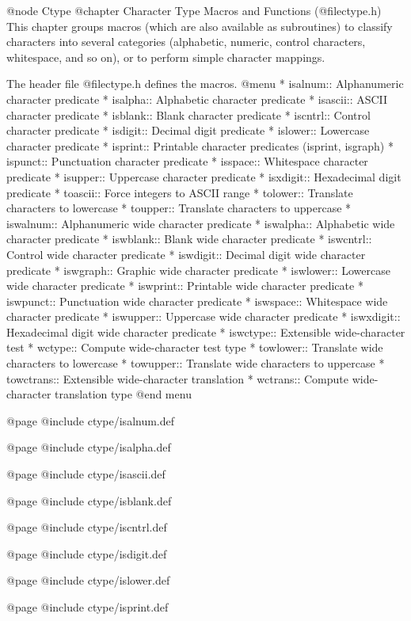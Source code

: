 @node Ctype
@chapter Character Type Macros and Functions (@file{ctype.h})
This chapter groups macros (which are also available as subroutines)
to classify characters into several categories (alphabetic,
numeric, control characters, whitespace, and so on), or to perform
simple character mappings.

The header file @file{ctype.h} defines the macros.
@menu 
* isalnum::   Alphanumeric character predicate
* isalpha::   Alphabetic character predicate
* isascii::   ASCII character predicate
* isblank::   Blank character predicate
* iscntrl::   Control character predicate
* isdigit::   Decimal digit predicate
* islower::   Lowercase character predicate
* isprint::   Printable character predicates (isprint, isgraph)
* ispunct::   Punctuation character predicate
* isspace::   Whitespace character predicate
* isupper::   Uppercase character predicate
* isxdigit::  Hexadecimal digit predicate
* toascii::   Force integers to ASCII range
* tolower::   Translate characters to lowercase
* toupper::   Translate characters to uppercase
* iswalnum::  Alphanumeric wide character predicate
* iswalpha::  Alphabetic wide character predicate
* iswblank::  Blank wide character predicate
* iswcntrl::  Control wide character predicate
* iswdigit::  Decimal digit wide character predicate
* iswgraph::  Graphic wide character predicate
* iswlower::  Lowercase wide character predicate
* iswprint::  Printable wide character predicate
* iswpunct::  Punctuation wide character predicate
* iswspace::  Whitespace wide character predicate
* iswupper::  Uppercase wide character predicate
* iswxdigit:: Hexadecimal digit wide character predicate
* iswctype::  Extensible wide-character test
* wctype::    Compute wide-character test type
* towlower::  Translate wide characters to lowercase
* towupper::  Translate wide characters to uppercase
* towctrans:: Extensible wide-character translation
* wctrans::   Compute wide-character translation type
@end menu

@page
@include ctype/isalnum.def

@page
@include ctype/isalpha.def

@page
@include ctype/isascii.def

@page
@include ctype/isblank.def

@page
@include ctype/iscntrl.def

@page
@include ctype/isdigit.def

@page
@include ctype/islower.def

@page
@include ctype/isprint.def


